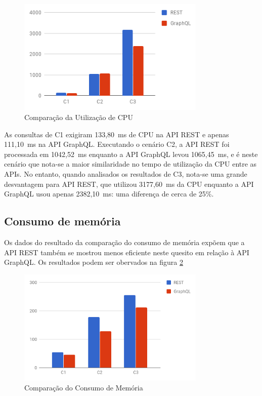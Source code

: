 \begin{figure}[htbp]
    \centering
    \includegraphics[width=0.8\textwidth]{figuras/q1-cpu.png}
    \caption{Comparação da Utilização de CPU}
    \label{fig:q1-cpu}
\end{figure}

As consultas de C1 exigiram 133,80~ms de CPU na API REST e apenas 111,10~ms na API GraphQL. Executando o cenário C2, a API REST foi processada em 1042,52~ms enquanto a API GraphQL levou 1065,45~ms, e é neste cenário que nota-se a maior similaridade no tempo de utilização da CPU entre as APIs. No entanto, quando analisados os resultados de C3, nota-se uma grande desvantagem para API REST, que utilizou 3177,60~ms da CPU enquanto a API GraphQL usou apenas 2382,10~ms: uma diferença de cerca de 25\%.
    
\subsection{Consumo de memória}

Os dados do resultado da comparação do consumo de memória expõem que a API REST também se mostrou menos eficiente neste quesito em relação à API GraphQL. Os resultados podem ser obervados na figura \ref{fig:q1-mem}

\begin{figure}[htbp]
    \centering
    \includegraphics[width=0.8\textwidth]{figuras/q1-memory.png}
    \caption{Comparação do Consumo de Memória}
    \label{fig:q1-mem}
\end{figure}

